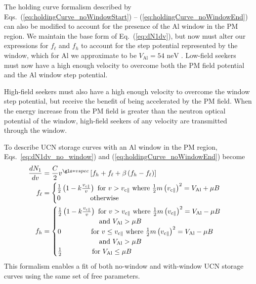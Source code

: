 The holding curve formalism described by Eqs.~(\ref{eq:holdingCurve_noWindowStart}) -- (\ref{eq:holdingCurve_noWindowEnd}) can also be modified to account for the presence of the Al window in the PM region. We maintain the base form of Eq.~(\ref{eq:dN1dv}), but now must alter our expressions for $f_\ell$ and $f_h$ to account for the step potential represented by the window, which for Al we approximate to be $V_\text{Al}=54\text{ neV}$ \cite{golubUCN}. Low-field seekers must now have a high enough velocity to overcome both the PM field potential and the Al window step potential. 

High-field seekers must also have a high enough velocity to overcome the window step potential, but receive the benefit of being accelerated by the PM field. When the energy increase from the PM field is greater than the neutron optical potential of the window, high-field seekers of any velocity are transmitted through the window.

To describe UCN storage curves with an Al window in the PM region, Eqs.~\ref{eq:dN1dv_no_window}) and (\ref{eq:holdingCurve_noWindowEnd}) become
%
\begin{align}
     \frac{dN_1}{dv} &= \frac{C}{2}v^{\gls*{vspec}} \left[ f_h + f_\ell + \beta \left( f_h - f_\ell \right)  \right] \label{eq:dN1dv_window}\\
     f_\ell &=\begin{cases}
        \frac{1}{2} \left(1 - k \frac{v_{\text{c}\parallel}}{v} \right) \text{ for }  v>v_{\text{c}\parallel} \text{ where } \frac{1}{2}m \left(v_{\text{c}\parallel}\right)^2 = V_\text{Al} + \mu B\\
        0 \hspace{43pt} \text{otherwise}\end{cases}\\
    f_h &=\begin{cases}
        \frac{1}{2} \left(1 - k \frac{v_{\text{c}\parallel}}{v} \right) \text{ for } v>v_{\text{c}\parallel} \text{ where } \frac{1}{2}m \left(v_{\text{c}\parallel}\right)^2 = V_\text{Al} - \mu B \\ 
        \hspace{60pt} \text{and } V_\text{Al} > \mu B\\
        0 \hspace{40pt} \text{ for } v \leq v_{\text{c}\parallel} \text{ where } \frac{1}{2}m \left(v_{\text{c}\parallel}\right)^2 = V_\text{Al} - \mu B \\ 
        \hspace{60pt} \text{and } V_\text{Al} > \mu B\\
        \frac{1}{2} \hspace{40pt} \text{ for } V_\text{Al} \leq \mu B \label{eq:holdingCurve_windowEnd}  \end{cases}
\end{align}
%
This formalism enables a fit of both no-window and with-window UCN storage curves using the same set of free parameters.

